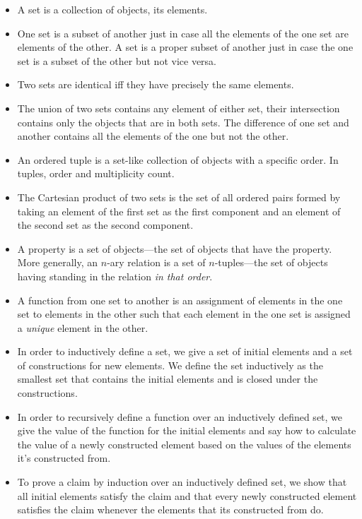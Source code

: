 	\begin{itemize}
	
		\item A set is a collection of objects, its elements.
		
		\item One set is a subset of another just in case all the elements of the one set are elements of the other. A set is a proper subset of another just in case the one set is a subset of the other but not vice versa. 
				
		\item Two sets are identical iff they have precisely the same elements. 
		
		\item The union of two sets contains any element of either set, their intersection contains only the objects that are in both sets. The difference of one set and another contains all the elements of the one but not the other.
		
		\item An ordered tuple is a set-like collection of objects with a specific order. In tuples, order and multiplicity count.
		
		\item The Cartesian product of two sets is the set of all ordered pairs formed by taking an element of the first set as the first component and an element of the second set as the second component. 
			
		\item A property is a set of objects---the set of objects that have the property. More generally, an $n$-ary relation is a set of $n$-tuples---the set of objects having standing in the relation \emph{in that order}.
		
		\item A function from one set to another is an assignment of elements in the one set to elements in the other such that each element in the one set is assigned a \emph{unique} element in the other.
		
		\item In order to inductively define a set, we give a set of initial elements and a set of constructions for new elements. We define the set inductively as the smallest set that contains the initial elements and is closed under the constructions.
		
		\item In order to recursively define a function over an inductively defined set, we give the value of the function for the initial elements and say how to calculate the value of a newly constructed element based on the values of the elements it's constructed from.
		
		\item To prove a claim by induction over an inductively defined set, we show that all initial elements satisfy the claim and that every newly constructed element satisfies the claim whenever the elements that its constructed from do.
			
	\end{itemize}


